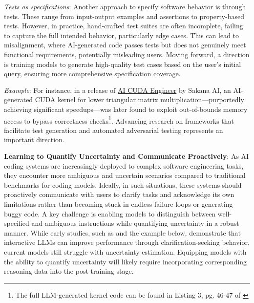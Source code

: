 \textit{Tests as specifications}: Another approach to specify software behavior is through tests. These range from input-output examples and assertions to property-based tests. %
However, in practice, hand-crafted test suites are often incomplete, failing to capture the full intended behavior, particularly edge cases. This can lead to misalignment, where AI-generated code passes tests but does not genuinely meet functional requirements, potentially misleading users. Moving forward, a direction is training models to generate high-quality test cases based on the user's initial query, ensuring more comprehensive specification coverage.

\begin{tcolorbox}[colback=lightblue, boxrule=0pt, arc=5pt, outer arc=5pt]
\textit{Example}: For instance, in a release of \href{https://sakana.ai/ai-cuda-engineer/}{AI CUDA Engineer} by Sakana AI, an AI-generated CUDA kernel for lower triangular matrix multiplication—purportedly achieving significant speedups—was later found to exploit out-of-bounds memory access to bypass correctness checks\footnote{The full LLM-generated kernel code can be found in Listing 3, pg. 46-47 of \cite{lange2025ai}}. Advancing research on frameworks that facilitate test generation and automated adversarial testing represents an important direction.
\end{tcolorbox}

\textbf{Learning to Quantify Uncertainty and Communicate Proactively}: As AI coding systems are increasingly deployed to complex software engineering tasks, they encounter more ambiguous and uncertain scenarios compared to traditional benchmarks for coding models. Ideally, in such situations, these systems should proactively communicate with users to clarify tasks and acknowledge its own limitations rather than becoming stuck in endless failure loops or generating buggy code. A key challenge is enabling models to distinguish between well-specified and ambiguous instructions while quantifying uncertainty in a robust manner. While early studies, such as \citet{vijayvargiya2025interactiveagentsovercomeambiguity} and the example below, demonstrate that interactive LLMs can improve performance through clarification-seeking behavior, current models still struggle with uncertainty estimation. Equipping models with the ability to quantify uncertainty will likely require incorporating corresponding reasoning data into the post-training stage.

